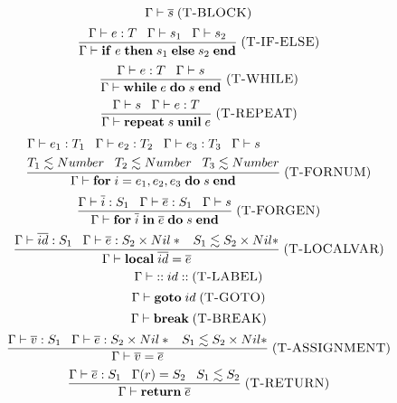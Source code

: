 \documentclass[12pt]{article}
\newcommand{\mylabel}[1]{\; (\textsc{#1})}
\newcommand{\env}{\Gamma}
\begin{document}
\[
\env \vdash \overline{s}
\mylabel{T-BLOCK}
\]
\[
\frac{\env \vdash e:T \;\;\; \env \vdash s_{1} \;\;\; \env \vdash s_{2}}
     {\env \vdash \mathbf{if} \; e \; \mathbf{then} \; s_{1} \;
      \mathbf{else} \; s_{2} \; \mathbf{end}}
\mylabel{T-IF-ELSE}
\]
\[
\frac{\env \vdash e:T \;\;\; \env \vdash s}
     {\env \vdash \mathbf{while} \; e \; \mathbf{do} \; s \; \mathbf{end}}
\mylabel{T-WHILE}
\]
\[
\frac{\env \vdash s \;\;\; \env \vdash e:T}
     {\env \vdash \mathbf{repeat} \; s \; \mathbf{unil} \; e}
\mylabel{T-REPEAT}
\]
\[
\frac{\begin{aligned}
      & \env \vdash e_{1}:T_{1} \;\;\; \env \vdash e_{2}:T_{2} \;\;\;
      \env \vdash e_{3}:T_{3} \;\;\; \env \vdash s\\
      & T_{1} \lesssim Number \;\;\;
      T_{2} \lesssim Number \;\;\;
      T_{3} \lesssim Number
      \end{aligned}}
     {\env \vdash \mathbf{for} \; i = e_{1},e_{2},e_{3} \;
      \mathbf{do} \; s \; \mathbf{end}}
\mylabel{T-FORNUM}
\]
\[
\frac{\env \vdash \overline{i}:S_{1} \;\;\; \env \vdash \overline{e}:S_{1}
      \;\;\; \env \vdash s}
     {\env \vdash \textbf{for} \; \overline{i} \; \mathbf{in} \; \overline{e}
      \; \mathbf{do} \; s \; \mathbf{end}}
\mylabel{T-FORGEN}
\]
\[
\frac{\env \vdash \overline{id}:S_{1} \;\;\;
      \env \vdash \overline{e}:S_2 \times Nil* \;\;\;
      S_{1} \lesssim S_{2} \times Nil*}
     {\env \vdash \mathbf{local} \; \overline{id} = \overline{e}}
\mylabel{T-LOCALVAR}
\]
\[
\env \vdash \mathbf{::} \; id \; \mathbf{::}
\mylabel{T-LABEL}
\]
\[
\env \vdash \mathbf{goto} \; id
\mylabel{T-GOTO}
\]
\[
\env \vdash \mathbf{break}
\mylabel{T-BREAK}
\]
\[
\frac{\env \vdash \overline{v}:S_{1} \;\;\;
      \env \vdash \overline{e}:S_2 \times Nil* \;\;\;
      S_{1} \lesssim S_{2} \times Nil*}
     {\env \vdash \overline{v} = \overline{e}}
\mylabel{T-ASSIGNMENT}
\]
\[
\frac{\env \vdash \overline{e}:S_{1} \;\;\;
      \env(r) = S_{2} \;\;\;
      S_{1} \lesssim S_{2}}
     {\env \vdash \mathbf{return} \; \overline{e}}
\mylabel{T-RETURN}
\]
\end{document}
